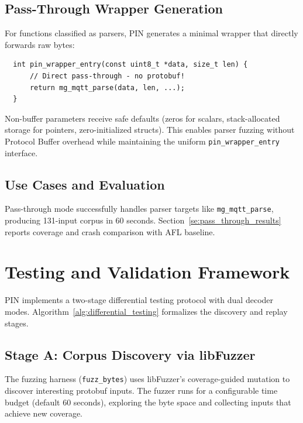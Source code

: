 \documentclass[doublespace,nopageskip]{VTthesis}
\begin{document}
  \subsection{Pass-Through Wrapper Generation}

  For functions classified as parsers, PIN generates a minimal wrapper that directly forwards raw bytes:

  \begin{verbatim}
  int pin_wrapper_entry(const uint8_t *data, size_t len) {
      // Direct pass-through - no protobuf!
      return mg_mqtt_parse(data, len, ...);
  }
  \end{verbatim}

  Non-buffer parameters receive safe defaults (zeros for scalars, stack-allocated storage for pointers, zero-initialized structs). This enables parser fuzzing without Protocol Buffer overhead while maintaining the uniform \texttt{pin\_wrapper\_entry} interface.

  \subsection{Use Cases and Evaluation}

  Pass-through mode successfully handles parser targets like \texttt{mg\_mqtt\_parse}, producing 131-input corpus in 60 seconds. Section~\ref{se:pass_through_results} reports coverage and crash comparison with AFL baseline.

  \section{Testing and Validation Framework} \label{se:testing_validation}

  PIN implements a two-stage differential testing protocol with dual decoder modes. Algorithm~\ref{alg:differential_testing} formalizes the discovery and replay stages.

  

  \subsection{Stage A: Corpus Discovery via libFuzzer}

  The fuzzing harness (\texttt{fuzz\_bytes}) uses libFuzzer's coverage-guided mutation to discover interesting protobuf inputs. The fuzzer runs for a configurable time budget (default 60 seconds), exploring the byte space and collecting inputs that achieve new coverage.
\end{document}
